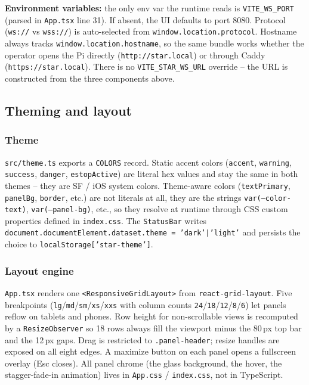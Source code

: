 \noindent\textbf{Environment variables:} the only env var the runtime
reads is \texttt{VITE\_WS\_PORT} (parsed in \texttt{App.tsx} line 31).
If absent, the UI defaults to port 8080. Protocol (\texttt{ws://} vs
\texttt{wss://}) is auto-selected from \texttt{window.location.protocol}.
Hostname always tracks \texttt{window.location.hostname}, so the same
bundle works whether the operator opens the Pi directly
(\texttt{http://star.local}) or through Caddy
(\texttt{https://star.local}). There is no \texttt{VITE\_STAR\_WS\_URL}
override -- the URL is constructed from the three components above.

\subsection{Theming and layout}

\subsubsection{Theme}

\texttt{src/theme.ts} exports a \texttt{COLORS} record. Static accent
colors (\texttt{accent}, \texttt{warning}, \texttt{success},
\texttt{danger}, \texttt{estopActive}) are literal hex values and stay
the same in both themes -- they are SF / iOS system colors. Theme-aware
colors (\texttt{textPrimary}, \texttt{panelBg}, \texttt{border}, etc.)
are not literals at all, they are the strings
\texttt{var(--color-text)}, \texttt{var(--panel-bg)}, etc., so they
resolve at runtime through CSS custom properties defined in
\texttt{index.css}. The \texttt{StatusBar} writes
\texttt{document.documentElement.dataset.theme = 'dark'|'light'} and
persists the choice to \texttt{localStorage['star-theme']}.

\subsubsection{Layout engine}

\texttt{App.tsx} renders one \texttt{<ResponsiveGridLayout>} from
\texttt{react-grid-layout}. Five breakpoints
(\texttt{lg}/\texttt{md}/\texttt{sm}/\texttt{xs}/\texttt{xxs} with
column counts \texttt{24}/\texttt{18}/\texttt{12}/\texttt{8}/\texttt{6})
let panels reflow on tablets and phones. Row height for non-scrollable
views is recomputed by a \texttt{ResizeObserver} so 18 rows always fill
the viewport minus the 80\,px top bar and the 12\,px gaps. Drag is
restricted to \texttt{.panel-header}; resize handles are exposed on all
eight edges. A maximize button on each panel opens a fullscreen
overlay (Esc closes). All panel chrome (the glass background, the
hover, the stagger-fade-in animation) lives in \texttt{App.css} /
\texttt{index.css}, not in TypeScript.

